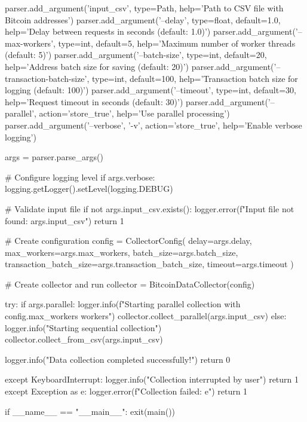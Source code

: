 \begin{codelisting}[language=Python, caption=Основной скрипт сбора данных]
    parser.add_argument('input_csv', type=Path, help='Path to CSV file with Bitcoin addresses')
    parser.add_argument('--delay', type=float, default=1.0, 
                       help='Delay between requests in seconds (default: 1.0)')
    parser.add_argument('--max-workers', type=int, default=5,
                       help='Maximum number of worker threads (default: 5)')
    parser.add_argument('--batch-size', type=int, default=20,
                       help='Address batch size for saving (default: 20)')
    parser.add_argument('--transaction-batch-size', type=int, default=100,
                       help='Transaction batch size for logging (default: 100)')
    parser.add_argument('--timeout', type=int, default=30,
                       help='Request timeout in seconds (default: 30)')
    parser.add_argument('--parallel', action='store_true',
                       help='Use parallel processing')
    parser.add_argument('--verbose', '-v', action='store_true',
                       help='Enable verbose logging')
    
    args = parser.parse_args()
    
    # Configure logging level
    if args.verbose:
        logging.getLogger().setLevel(logging.DEBUG)
    
    # Validate input file
    if not args.input_csv.exists():
        logger.error(f"Input file not found: {args.input_csv}")
        return 1
    
    # Create configuration
    config = CollectorConfig(
        delay=args.delay,
        max_workers=args.max_workers,
        batch_size=args.batch_size,
        transaction_batch_size=args.transaction_batch_size,
        timeout=args.timeout
    )
    
    # Create collector and run
    collector = BitcoinDataCollector(config)
    
    try:
        if args.parallel:
            logger.info(f"Starting parallel collection with {config.max_workers} workers")
            collector.collect_parallel(args.input_csv)
        else:
            logger.info("Starting sequential collection")
            collector.collect_from_csv(args.input_csv)
        
        logger.info("Data collection completed successfully!")
        return 0
        
    except KeyboardInterrupt:
        logger.info("Collection interrupted by user")
        return 1
    except Exception as e:
        logger.error(f"Collection failed: {e}")
        return 1


if __name__ == "__main__":
    exit(main())
\end{codelisting}
